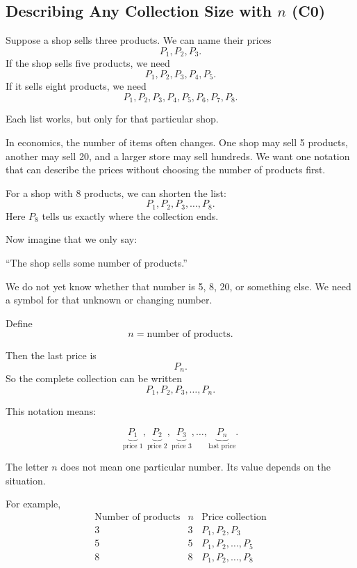 	
	\subsection{Describing Any Collection Size with $n$ (C0)}
	\label{sec:size-n-c0}
	
	Suppose a shop sells three products. We can name their prices
	\[
	P_1,P_2,P_3.
	\]
	If the shop sells five products, we need
	\[
	P_1,P_2,P_3,P_4,P_5.
	\]
	If it sells eight products, we need
	\[
	P_1,P_2,P_3,P_4,P_5,P_6,P_7,P_8.
	\]
	
	Each list works, but only for that particular shop.
	
	In economics, the number of items often changes. One shop may sell 5 products, another may sell 20, and a larger store may sell hundreds. We want one notation that can describe the prices without choosing the number of products first.
	
	For a shop with 8 products, we can shorten the list:
	\[
	P_1,P_2,P_3,\ldots,P_8.
	\]
	Here $P_8$ tells us exactly where the collection ends.
	
	Now imagine that we only say:
	
	\begin{center}
		``The shop sells some number of products.''
	\end{center}
	
	We do not yet know whether that number is 5, 8, 20, or something else. We need a symbol for that unknown or changing number.
	
	Define
	\[
	n=\text{number of products}.
	\]
	
	Then the last price is
	\[
	P_n.
	\]
	So the complete collection can be written
	\[
	P_1,P_2,P_3,\ldots,P_n.
	\]
	
	This notation means:
	
	\[
	\underbrace{P_1}_{\text{price 1}},
	\underbrace{P_2}_{\text{price 2}},
	\underbrace{P_3}_{\text{price 3}},
	\ldots,
	\underbrace{P_n}_{\text{last price}}.
	\]
	
	The letter $n$ does not mean one particular number. Its value depends on the situation.
	
	For example,
	\[
	\begin{array}{c|c|c}
		\text{Number of products} & n & \text{Price collection} \\
		\hline
		3 & 3 & P_1,P_2,P_3 \\
		5 & 5 & P_1,P_2,\ldots,P_5 \\
		8 & 8 & P_1,P_2,\ldots,P_8
	\end{array}
	\]
	
